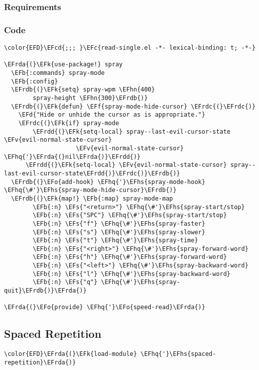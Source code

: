 \documentclass[a4wide,10pt]{article}
\newcommand{\EFc}[1]{\textcolor{EFc}{#1}} %
\newcommand{\EFcd}[1]{\textcolor{EFcd}{#1}} %
\newcommand{\EFs}[1]{\textcolor{EFs}{#1}} %
\newcommand{\EFd}[1]{\textcolor{EFd}{#1}} %
\newcommand{\EFk}[1]{\textcolor{EFk}{#1}} %
\newcommand{\EFb}[1]{\textcolor{EFb}{#1}} %
\newcommand{\EFf}[1]{\textcolor{EFf}{#1}} %
\newcommand{\EFv}[1]{\textcolor{EFv}{#1}} %
\newcommand{\EFo}[1]{\textcolor{EFo}{#1}} %
\newcommand{\EFhn}[1]{\textcolor{EFhn}{\textbf{#1}}} %
\newcommand{\EFhq}[1]{\textcolor{EFhq}{#1}} %
\newcommand{\EFhs}[1]{\textcolor{EFhs}{#1}} %
\newcommand{\EFrda}[1]{\textcolor{EFrda}{#1}} %
\newcommand{\EFrdb}[1]{\textcolor{EFrdb}{#1}} %
\newcommand{\EFrdc}[1]{\textcolor{EFrdc}{#1}} %
\newcommand{\EFrdd}[1]{\textcolor{EFrdd}{#1}} %
\begin{document}
\subsubsection{Requirements}
\label{sec:org6b76319}
\subsubsection{Code}
\label{sec:org50ec4fb}
\begin{Code}
\begin{Verbatim}
\color{EFD}\EFcd{;;; }\EFc{read-single.el -*- lexical-binding: t; -*-}

\EFrda{(}\EFk{use-package!} spray
  \EFb{:commands} spray-mode
  \EFb{:config}
  \EFrdb{(}\EFk{setq} spray-wpm \EFhn{400}
        spray-height \EFhn{300}\EFrdb{)}
  \EFrdb{(}\EFk{defun} \EFf{spray-mode-hide-cursor} \EFrdc{(}\EFrdc{)}
    \EFd{"Hide or unhide the cursor as is appropriate."}
    \EFrdc{(}\EFk{if} spray-mode
        \EFrdd{(}\EFk{setq-local} spray--last-evil-cursor-state \EFv{evil-normal-state-cursor}
                    \EFv{evil-normal-state-cursor} \EFhq{'}\EFrda{(}nil\EFrda{)}\EFrdd{)}
      \EFrdd{(}\EFk{setq-local} \EFv{evil-normal-state-cursor} spray--last-evil-cursor-state\EFrdd{)}\EFrdc{)}\EFrdb{)}
  \EFrdb{(}\EFo{add-hook} \EFhq{'}\EFhs{spray-mode-hook} \EFhq{\#'}\EFhs{spray-mode-hide-cursor}\EFrdb{)}
  \EFrdb{(}\EFk{map!} \EFb{:map} spray-mode-map
        \EFb{:n} \EFs{"<return>"} \EFhq{\#'}\EFhs{spray-start/stop}
        \EFb{:n} \EFs{"SPC"} \EFhq{\#'}\EFhs{spray-start/stop}
        \EFb{:n} \EFs{"f"} \EFhq{\#'}\EFhs{spray-faster}
        \EFb{:n} \EFs{"s"} \EFhq{\#'}\EFhs{spray-slower}
        \EFb{:n} \EFs{"t"} \EFhq{\#'}\EFhs{spray-time}
        \EFb{:n} \EFs{"<right>"} \EFhq{\#'}\EFhs{spray-forward-word}
        \EFb{:n} \EFs{"h"} \EFhq{\#'}\EFhs{spray-forward-word}
        \EFb{:n} \EFs{"<left>"} \EFhq{\#'}\EFhs{spray-backward-word}
        \EFb{:n} \EFs{"l"} \EFhq{\#'}\EFhs{spray-backward-word}
        \EFb{:n} \EFs{"q"} \EFhq{\#'}\EFhs{spray-quit}\EFrdb{)}\EFrda{)}

\EFrda{(}\EFo{provide} \EFhq{'}\EFo{speed-read}\EFrda{)}
\end{Verbatim}
\end{Code}

\subsection{Spaced Repetition}
\label{sec:orgabd8f3e}
\begin{Code}
\begin{Verbatim}
\color{EFD}\EFrda{(}\EFk{load-module} \EFhq{'}\EFhs{spaced-repetition}\EFrda{)}
\end{Verbatim}
\end{Code}
\end{document}
